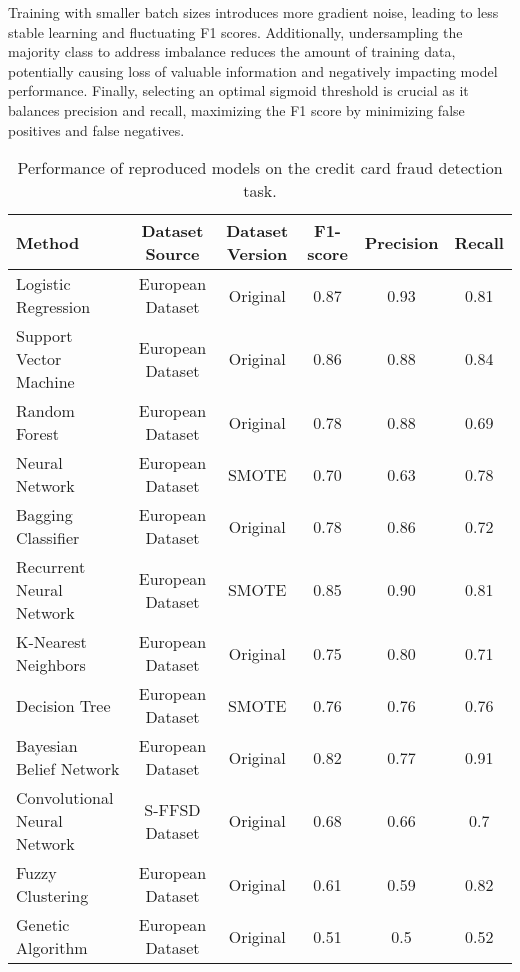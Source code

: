 \documentclass{article}
\begin{document}
Training with smaller batch sizes introduces more gradient noise, leading to less stable learning and fluctuating F1 scores. Additionally, undersampling the majority class to address imbalance reduces the amount of training data, potentially causing loss of valuable information and negatively impacting model performance. Finally, selecting an optimal sigmoid threshold is crucial as it balances precision and recall, maximizing the F1 score by minimizing false positives and false negatives.
  
\begin{table}[h]
    \centering
    \begin{tabular}{lccccc}
        \toprule
        Method & Dataset Source & Dataset Version & F1-score & Precision & Recall \\
        \midrule
        Logistic Regression & European Dataset & Original & 0.87 & 0.93 & 0.81 \\
        Support Vector Machine & European Dataset & Original & 0.86 & 0.88 & 0.84 \\
        Random Forest & European Dataset & Original & 0.78 & 0.88 & 0.69 \\
        Neural Network & European Dataset & SMOTE & 0.70 & 0.63 & 0.78 \\
        Bagging Classifier & European Dataset & Original & 0.78 & 0.86 & 0.72 \\
        Recurrent Neural Network & European Dataset & SMOTE & 0.85 & 0.90 & 0.81 \\
        K-Nearest Neighbors & European Dataset & Original & 0.75 & 0.80 & 0.71 \\
        Decision Tree & European Dataset & SMOTE & 0.76 & 0.76 & 0.76 \\
        Bayesian Belief Network & European Dataset & Original & 0.82 & 0.77 & 0.91 \\
        Convolutional Neural Network & S-FFSD Dataset & Original & 0.68 & 0.66 & 0.7 \\
        Fuzzy Clustering & European Dataset & Original & 0.61 & 0.59 & 0.82 \\
        Genetic Algorithm & European Dataset & Original & 0.51 & 0.5 & 0.52 \\


        \bottomrule
    \end{tabular}
    \caption{Performance of reproduced models on the credit card fraud detection task.}
    \label{tab:results}
\end{table}
\end{document}
